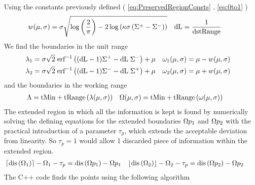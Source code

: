Using the constants previously defined ( \ref{eq:PreservedRegionConsts} , \ref{eq:0to1} )
\begin{align*}
  w(\mu,\sigma)  & =  \sigma  \sqrt{ \log \left(\frac{2}{\pi } \right) -2 \log \left(\kappa \sigma  \left(\Sigma^+-\Sigma^-\right)\right) } &
  \text{dL} &= \frac{1}{\text{dstRange}} 
\end{align*}
We find the boundaries in the unit range 
\begin{equation}
\begin{aligned}
\lambda_1 &= \sigma \sqrt{2} \; \text{erf}^{-1}\left((\text{dL}-1) \Sigma^+-\text{dL} \; \Sigma^-\right)+\mu  &       
\omega_1(\mu,\sigma) &= \mu - w(\mu,\sigma)  \\     
\lambda_2 &= \sigma \sqrt{2} \; \text{erf}^{-1}\left((\text{dL}-1) \Sigma^- -\text{dL} \; \Sigma^+ \right)+\mu &
\omega_2(\mu,\sigma) &= \mu + w(\mu,\sigma) 
\end{aligned}
\end{equation}
and the boundaries in the working range
\begin{equation}
\begin{aligned}
\Lambda &= \text{tMin} + \text{tRange} \left( \lambda(\mu,\sigma) \right) & 
\Omega(\mu,\sigma) &= \text{tMin} + \text{tRange}\left( \omega(\mu,\sigma) \right) 
\end{aligned}
\end{equation}
The extended region in which all the information is kept is found by numerically solving the defining equations for the  extended boundaries $\Omega p_1$ and $\Omega p_2$ with the practical introduction of a parameter $ \tau_{p} $, which extends the acceptable deviation from linearity. So $ \tau_{p} =1$ would allow 1 discarded piece of information within the extended region.
\begin{equation}
\begin{aligned}
\left\lceil\text{dis}\left(\Omega _1\right)\right\rceil-\Omega _1 - \tau_{p} & =\text{dis}\left(\Omega p _1\right)- \Omega p _1 &
\left\lfloor\text{dis}\left(\Omega _2\right)\right\rfloor-\Omega _2 - \tau_{p} & =\text{dis}\left(\Omega p _2\right)- \Omega p _2 
\end{aligned}
\end{equation}
The C++ code finds the points using the following algorithm

